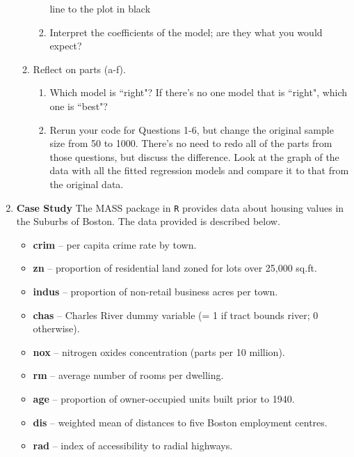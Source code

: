 \documentclass{article}
\begin{document}
\begin{enumerate}
\begin{enumerate}
\begin{enumerate}
    line to the plot in black
    \item Interpret the coefficients of the model; are they what you would expect?
  \end{enumerate}
  \item Reflect on parts (a-f).
  \begin{enumerate}
    \item Which model is ``right"? If there's no one model 
      that is ``right", which one is ``best"?
    \item Rerun your code for Questions 1-6, but change the original sample size
    from 50 to 1000. There's no need to redo all of the parts from those questions,
    but discuss the difference. Look at the graph of the data with all the fitted
    regression models and compare it to that from the original data.
  \end{enumerate}
  \end{enumerate}
    \item \textbf{Case Study} The MASS package in \texttt{R} \citep{MASS} provides data about housing values
  in the Suburbs of Boston. The data provided is described below.
  \begin{itemize}
    \item \textbf{crim} -- per capita crime rate by town.
    \item \textbf{zn} -- proportion of residential land zoned for lots over 25,000 sq.ft.
    \item \textbf{indus} -- proportion of non-retail business acres per town.
    \item \textbf{chas} -- Charles River dummy variable (= 1 if tract bounds river; 0 otherwise).
    \item \textbf{nox} -- nitrogen oxides concentration (parts per 10 million).
    \item \textbf{rm} -- average number of rooms per dwelling.
    \item \textbf{age} -- proportion of owner-occupied units built prior to 1940.
    \item \textbf{dis} -- weighted mean of distances to five Boston employment centres.
    \item \textbf{rad} -- index of accessibility to radial highways.

\end{itemize}
\end{enumerate}
\end{document}
